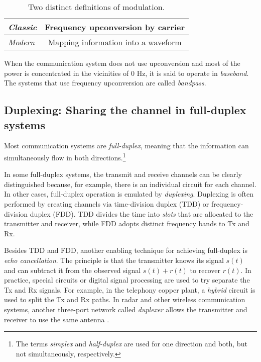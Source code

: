 \begin{table}
\centering
\caption{Two distinct definitions of modulation.\label{tab:modulationJargon}}
\begin{tabular}{|l|c|}
\hline
\emph{Classic} & Frequency upconversion by carrier \\ \hline
\emph{Modern} & Mapping information into a waveform \\ \hline
\end{tabular}
\end{table}


When the communication system does not use upconversion and most of the power is concentrated in the vicinities of 0 Hz, it is said to operate in \emph{baseband}. The systems that use frequency upconversion are called 
\emph{bandpass}.


 
\subsection{Duplexing: Sharing the channel in full-duplex systems}

Most communication systems are \emph{full-duplex}, meaning that the information can simultaneously flow in both directions.\footnote{The terms \emph{simplex} and \emph{half-duplex} are used for one direction and both, but not simultaneously, respectively.}

In some full-duplex systems, the transmit and receive channels can be clearly distinguished because, for example, there is an individual circuit for each channel. In other cases, full-duplex operation is emulated by \emph{duplexing}. Duplexing is often performed by creating channels via time-division duplex (TDD) or frequency-division duplex (FDD). TDD divides the time into \emph{slots} that are allocated to the transmitter and receiver, while FDD adopts distinct frequency bands to Tx and Rx.

Besides TDD and FDD, another enabling technique for achieving full-duplex is \emph{echo cancellation}. The principle is that the transmitter knows its signal $s(t)$ and can subtract it from the observed signal $s(t)+r(t)$ to recover $r(t)$.
In practice, special circuits or digital signal processing are used to try separate the Tx and Rx signals. 
For example, in the telephony copper plant, a \emph{hybrid} circuit is used to split the Tx and Rx paths. In radar and other wireless communication systems, another three-port network called \emph{duplexer} allows the transmitter and receiver to use the same antenna .

